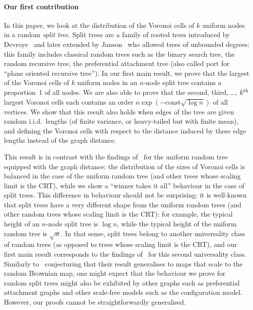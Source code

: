 \documentclass[10pt]{amsart}
\theoremstyle{definition}\newtheorem{defi}[theo]{Definition}\newtheorem{rema}[theo]{Remark}\newtheorem{exam}[theo]{Example}\newtheorem{exem}[theo]{Example}\newtheorem{nota}[theo]{Notation}
\newcommand{\const}{\mathrm{const}}
\begin{document}
\paragraph*{Our first contribution}
In this paper, we look at the distribution of the Voronoi cells of $k$ uniform nodes in a random \emph{split tree}. Split trees are a family of rooted trees introduced by Devroye~\cite{devroye-split} and later extended by Janson~\cite{Janson} who allowed trees of unbounded degrees: this family includes classical random trees such as the binary search tree, the random recursive tree, the preferential attachment tree (also called {\sc port} for ``plane oriented recursive tree''). In our first main result, we prove that the largest of the Voronoi cells of $k$ uniform nodes in an $n$-node split tree contains a proportion~1 of all nodes. We are also able to prove that the second, third, \dots, $k^{\rm th}$ largest Voronoi cells each contains an order $n\exp(-\const\sqrt{\log n})$ of all vertices. We show that this result also holds when edges of the tree are given random i.i.d.\ lengths (of finite variance, or heavy-tailed but with finite mean), and defining the Voronoi cells with respect to the distance induced by these edge lengths instead of the graph distance.

This result is in contrast with the findings of~\cite{Chapuy} for the uniform random tree equipped with the graph distance: the distribution of the sizes of Voronoi cells is balanced in the case of the uniform random tree (and other trees whose scaling limit is the CRT), while we show a ``winner takes it all'' behaviour in the case of split trees. This difference in behaviour should not be surprising: it is well-known that split trees have a very different shape from the uniform random trees (and other random trees whose scaling limit is the CRT): for example, the typical height of an $n$-node split tree is $\log n$, while the typical height of the uniform random tree is $\sqrt n$. In that sense, split trees belong to another universality class of random trees (as opposed to trees whose scaling limit is the CRT), and our first main result corresponds to the findings of~\cite{Chapuy} for this second universality class. Similarly to~\cite{Chapuy} conjecturing that their result generalises to maps that scale to the random Brownian map, one might expect that the behaviour we prove for random split trees might also be exhibited by other graphs such as preferential attachment graphs and other scale-free models such as the configuration model. However, our proofs cannot be straightforwardly generalised.
\end{document}
